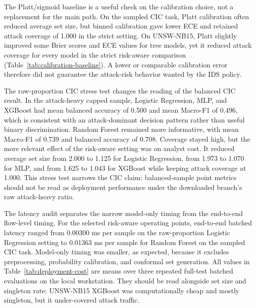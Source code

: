 \documentclass[11pt]{article}
\begin{document}


The Platt/sigmoid baseline is a useful check on the calibration choice, not a replacement for the main path. On the sampled CIC task, Platt calibration often reduced average set size, but binned calibration gave lower ECE and retained attack coverage of 1.000 in the strict setting. On UNSW-NB15, Platt slightly improved some Brier scores and ECE values for tree models, yet it reduced attack coverage for every model in the strict risk-aware comparison (Table~\ref{tab:calibration-baseline}). A lower or comparable calibration error therefore did not guarantee the attack-risk behavior wanted by the IDS policy.



The raw-proportion CIC stress test changes the reading of the balanced CIC result. In the attack-heavy capped sample, Logistic Regression, MLP, and XGBoost had mean balanced accuracy of 0.500 and mean Macro-F1 of 0.496, which is consistent with an attack-dominant decision pattern rather than useful binary discrimination. Random Forest remained more informative, with mean Macro-F1 of 0.739 and balanced accuracy of 0.708. Coverage stayed high, but the more relevant effect of the risk-aware setting was on analyst cost. It reduced average set size from 2.000 to 1.125 for Logistic Regression, from 1.973 to 1.070 for MLP, and from 1.625 to 1.043 for XGBoost while keeping attack coverage at 1.000. This stress test narrows the CIC claim: balanced-sample point metrics should not be read as deployment performance under the downloaded branch's raw attack-heavy ratio.



The latency audit separates the narrow model-only timing from the end-to-end flow-level timing. For the selected risk-aware operating points, end-to-end batched latency ranged from 0.00300 ms per sample on the raw-proportion Logistic Regression setting to 0.01363 ms per sample for Random Forest on the sampled CIC task. Model-only timing was smaller, as expected, because it excludes preprocessing, probability calibration, and conformal set generation. All values in Table~\ref{tab:deployment-cost} are means over three repeated full-test batched evaluations on the local workstation. They should be read alongside set size and singleton rate: UNSW-NB15 XGBoost was computationally cheap and mostly singleton, but it under-covered attack traffic.
\end{document}
